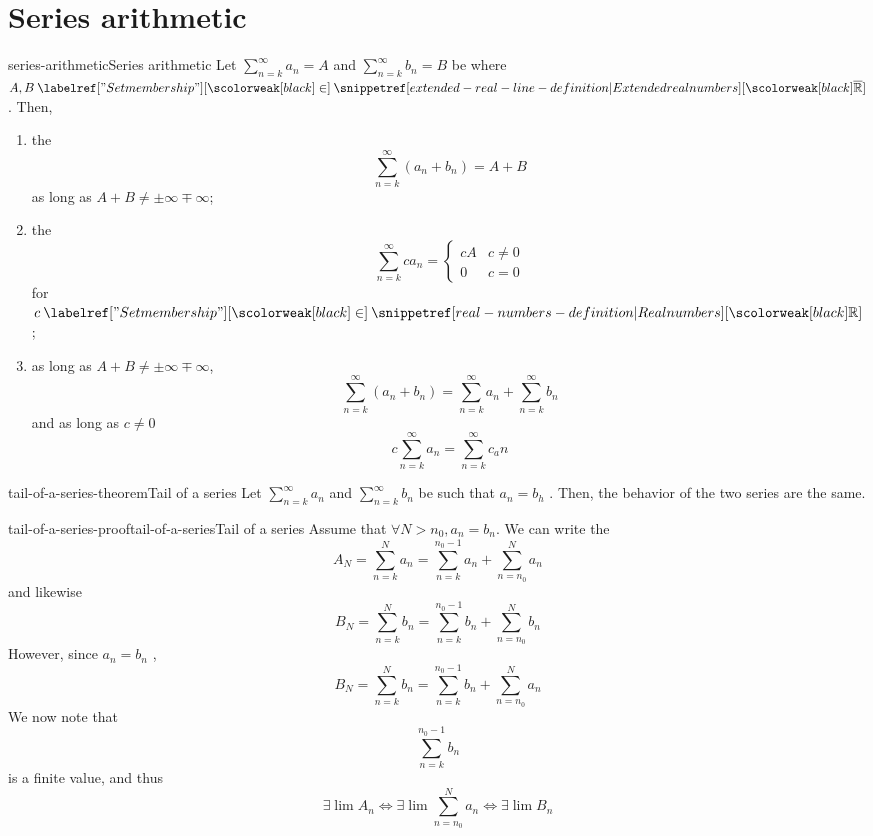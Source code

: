 \documentclass[preview]{standalone}
\begin{document}
\section{Series arithmetic}

\begin{snippetproposition}{series-arithmetic}{Series arithmetic}
    Let \(\sum_{n=k}^\infty a_n = A\) and \(\sum_{n=k}^\infty b_n = B\) be \series
    where \(A,B\in\extendedrealnumbers\). Then,
    \begin{enumerate}
        \item the \series \[ \sum_{n=k}^\infty \left(a_n+b_n\right) = A+B \]
        as long as \(A+B\neq \pm\infty \mp\infty\);
        \item the \series \[ \sum_{n=k}^\infty ca_n = \begin{cases} cA & c\neq 0 \\ 0 & c=0 \end{cases} \]
            for \(c\in\realnumbers\);
        \item as long as \(A+B\neq \pm\infty \mp\infty\),
            \[
                \sum_{n=k}^\infty (a_n+b_n) = \sum_{n=k}^\infty a_n + \sum_{n=k}^\infty b_n
            \]
            and as long as \(c\neq 0\)
            \[
                c\sum_{n=k}^\infty a_n = \sum_{n=k}^\infty c_an
            \]
    \end{enumerate}
\end{snippetproposition}

\begin{snippettheorem}{tail-of-a-series-theorem}{Tail of a series}
    Let \(\sum_{n=k}^\infty a_n\) and \(\sum_{n=k}^\infty b_n\) be \series
    such that \(a_n = b_h\) \eventually.
    Then, the behavior of the two series are the same.
\end{snippettheorem}


\begin{snippetproof}{tail-of-a-series-proof}{tail-of-a-series}{Tail of a series}
    Assume that \(\forall N>n_0, a_n = b_n\).
    We can write the \partialsum
    \[
        A_N = \sum_{n=k}^N a_n = \sum_{n=k}^{n_0 - 1}a_n
        + \sum_{n=n_0}^N a_n
    \]
    and likewise
    \[
        B_N = \sum_{n=k}^N b_n = \sum_{n=k}^{n_0 - 1}b_n
        + \sum_{n=n_0}^N b_n
    \]
    However, since \(a_n = b_n\) \eventually,
    \[
        B_N = \sum_{n=k}^N b_n = \sum_{n=k}^{n_0 - 1}b_n
        + \sum_{n=n_0}^N a_n
    \]
    We now note that
    \[ \sum_{n=k}^{n_0 - 1}b_n \]
    is a finite value, and thus
    \[
        \exists \lim A_n
        \iff
        \exists \lim \sum_{n=n_0}^N a_n
        \iff
        \exists \lim B_n
    \]
\end{snippetproof}
\end{document}
